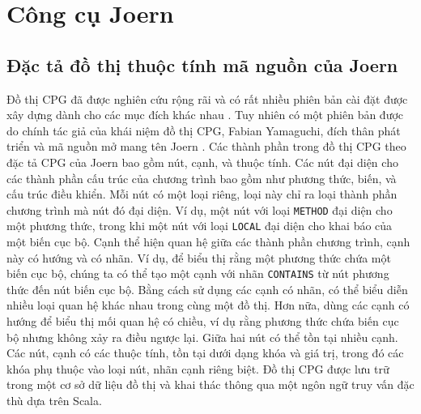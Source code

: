 \section{Công cụ Joern}

\subsection{Đặc tả đồ thị thuộc tính mã nguồn của Joern}


Đồ thị CPG đã được nghiên cứu rộng rãi và có rất nhiều phiên bản cài đặt được xây dựng dành cho các mục đích khác nhau \cite{ kuchler2022representing, weiss2022language, keirsgieter2020graft}.
Tuy nhiên có một phiên bản được do chính tác giả của khái niệm đồ thị CPG, Fabian Yamaguchi, đích thân phát triển và mã nguồn mở mang tên Joern \cite{joernJoernHunteraposs}.
Các thành phần trong đồ thị CPG theo đặc tả CPG của Joern bao gồm nút, cạnh, và thuộc tính.
Các nút đại diện cho các thành phần cấu trúc của chương trình bao gồm như phương thức, biến, và cấu trúc điều khiển.
Mỗi nút có một loại riêng, loại này chỉ ra loại thành phần chương trình mà nút đó đại diện.
Ví dụ, một nút với loại \texttt{METHOD} đại diện cho một phương thức, trong khi một nút với loại \texttt{LOCAL} đại diện cho khai báo của một biến cục bộ.
Cạnh thể hiện quan hệ giữa các thành phần chương trình, cạnh này có hướng và có nhãn.
Ví dụ, để biểu thị rằng một phương thức chứa một biến cục bộ, chúng ta có thể tạo một cạnh với nhãn \texttt{CONTAINS} từ nút phương thức đến nút biến cục bộ.
Bằng cách sử dụng các cạnh có nhãn, có thể biểu diễn nhiều loại quan hệ khác nhau trong cùng một đồ thị.
Hơn nữa, dùng các cạnh có hướng để biểu thị mối quan hệ có chiều, ví dụ rằng phương thức chứa biến cục bộ nhưng không xảy ra điều ngược lại.
Giữa hai nút có thể tồn tại nhiều cạnh.
Các nút, cạnh có các thuộc tính, tồn tại dưới dạng khóa và giá trị, trong đó các khóa phụ thuộc vào loại nút, nhãn cạnh riêng biệt.
Đồ thị CPG được lưu trữ trong một cơ sở dữ liệu đồ thị và khai thác thông qua một ngôn ngữ truy vấn đặc thù dựa trên Scala.

